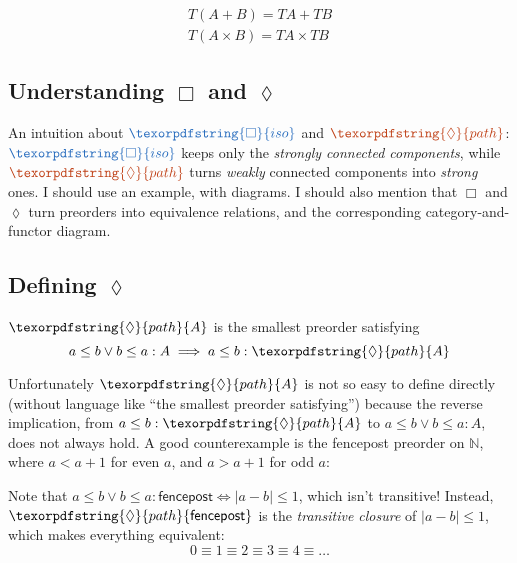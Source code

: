 \documentclass[ribbons]{rntz}
\newcommand{\todo}[1]{{\color{Purple}#1}}
\newcommand{\N}{\mathbb{N}}
\newcommand{\x}{\times}
\newcommand{\iso}{\ensuremath{\textrm{iso}}}     %
\renewcommand{\path}{\ensuremath{\textrm{path}}} %
\renewcommand{\iso}{\texorpdfstring{\ensuremath{\Box}}{iso}}
\renewcommand{\path}{\texorpdfstring{\ensuremath{\lozenge}}{path}}
\newcommand{\toneof}[2]{#1 #2}
\newcommand{\pathof}{\path}
\newcommand{\ti}{{\color{NavyBlue}\iso}}     %
\newcommand{\tb}{{\color{Bittersweet}\path}} %
\begin{document}
\begin{theorem}[Tones distribute over $\x$ and $+$]\label{thm:tones-monoidal}
  \begin{eqnarray*}
    \toneof{T}{(A + B)} = \toneof{T}{A} + \toneof{T}{B}\\
    \toneof{T}{(A \x B)} = \toneof{T}{A} \x \toneof{T}{B}
  \end{eqnarray*}
\end{theorem}

\subsection{Understanding \iso{} and \path{}}

\todo{An intuition about $\ti$ and $\tb$: $\ti$ keeps only the \emph{strongly
    connected components}, while $\tb$ turns \emph{weakly} connected components
  into \emph{strong} ones. I should use an example, with diagrams. I should also
  mention that \iso{} and \path{} turn preorders into equivalence relations, and
  the corresponding cate\-gory-and-functor diagram.}

\subsection{Defining \path{}} \label{sec:defining-path}

$\pathof{A}$ is the smallest preorder satisfying
\[ a \le b \vee b \le a : A \implies a \le b : \pathof{A} \]

Unfortunately $\pathof{A}$ is not so easy to define directly (without language
like ``the smallest preorder satisfying'') because the reverse implication, from
$a \le b : \pathof{A}$ to $a \le b \vee b \le a : A$, does not always hold. A
good counterexample is the \textsf{fencepost} preorder on $\N$, where $a < a+1$
for even $a$, and $a > a+1$ for odd $a$:

\begin{center}
\end{center}

Note that $a \le b \vee b \le a : \textsf{fencepost} \iff |a-b| \le 1$, which
isn't transitive! Instead, $\pathof{\textsf{fencepost}}$ is the \emph{transitive
  closure} of $|a-b| \le 1$, which makes everything equivalent:
\[ 0 \equiv 1 \equiv 2 \equiv 3 \equiv 4 \equiv \dots \]
\end{document}
